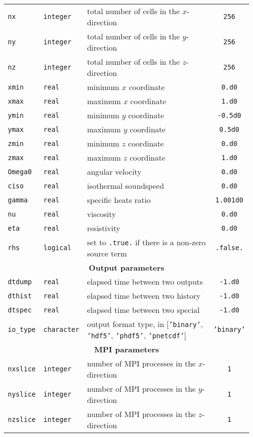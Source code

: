 \documentclass[a4paper,12pt]{article}
\begin{document}
\begin{table}[h!]
{\begin{tabular}{l | l | p{} | c }
    \texttt{nx} & \texttt{integer} & total number of cells in the $x$-direction & \texttt{256} \\
    \texttt{ny} & \texttt{integer} & total number of cells in the $y$-direction & \texttt{256} \\
    \texttt{nz} & \texttt{integer} & total number of cells in the $z$-direction & \texttt{256} \\
    \texttt{xmin} & \texttt{real} & minimum $x$ coordinate & \texttt{0.d0} \\
    \texttt{xmax} & \texttt{real} & maximum $x$ coordinate & \texttt{1.d0} \\
    \texttt{ymin} & \texttt{real} & minimum $y$ coordinate & \texttt{-0.5d0} \\
    \texttt{ymax} & \texttt{real} & maximum $y$ coordinate & \texttt{0.5d0} \\
    \texttt{zmin} & \texttt{real} & minimum $z$ coordinate & \texttt{0.d0} \\
    \texttt{zmax} & \texttt{real} & maximum $z$ coordinate & \texttt{1.d0} \\
    \texttt{Omega0} & \texttt{real} & angular velocity & \texttt{0.d0} \\
    \texttt{ciso} & \texttt{real} & isothermal soundspeed & \texttt{0.d0} \\
    \texttt{gamma} & \texttt{real} & specific heats ratio & \texttt{1.001d0} \\
    \texttt{nu} & \texttt{real} & viscosity & \texttt{0.d0} \\
    \texttt{eta} & \texttt{real} & resistivity & \texttt{0.d0} \\
    \texttt{rhs} & \texttt{logical} & set to \texttt{.true.} if there is a non-zero source term & \texttt{.false.} \\
    \hline
    \multicolumn{4}{c}{\normalsize \bfseries Output parameters} \\
    \hline
    \texttt{dtdump} & \texttt{real} & elapsed time between two outputs & \texttt{-1.d0} \\
    \texttt{dthist} & \texttt{real} & elapsed time between two history & \texttt{-1.d0} \\
    \texttt{dtspec} & \texttt{real} & elapsed time between two special & \texttt{-1.d0} \\
    \texttt{io\_type} & \texttt{character} & output format type, in [\texttt{'binary'}, \texttt{'hdf5'}, \texttt{'phdf5'}, \texttt{'pnetcdf'}] & \texttt{'binary'} \\
    \hline
    \multicolumn{4}{c}{\normalsize \bfseries MPI parameters} \\
    \hline
    \texttt{nxslice} & \texttt{integer} & number of MPI processes in the $x$-direction & \texttt{1} \\
    \texttt{nyslice} & \texttt{integer} & number of MPI processes in the $y$-direction & \texttt{1} \\
    \texttt{nzslice} & \texttt{integer} & number of MPI processes in the $z$-direction & \texttt{1} \\
    \hline
  \end{tabular}
  }
\end{table}
\clearpage
\end{document}
